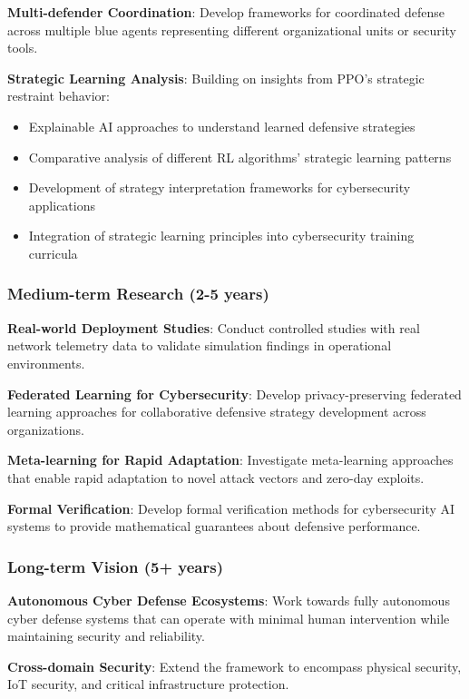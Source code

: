 \documentclass[12pt,twoside]{article}
\theoremstyle{definition}
\theoremstyle{plain}
\begin{document}
\textbf{Multi-defender Coordination}: Develop frameworks for coordinated defense across multiple blue agents representing different organizational units or security tools.

\textbf{Strategic Learning Analysis}: Building on insights from PPO's strategic restraint behavior:
\begin{itemize}
\item Explainable AI approaches to understand learned defensive strategies
\item Comparative analysis of different RL algorithms' strategic learning patterns
\item Development of strategy interpretation frameworks for cybersecurity applications
\item Integration of strategic learning principles into cybersecurity training curricula
\end{itemize}

\subsubsection{Medium-term Research (2-5 years)}

\textbf{Real-world Deployment Studies}: Conduct controlled studies with real network telemetry data to validate simulation findings in operational environments.

\textbf{Federated Learning for Cybersecurity}: Develop privacy-preserving federated learning approaches for collaborative defensive strategy development across organizations.

\textbf{Meta-learning for Rapid Adaptation}: Investigate meta-learning approaches that enable rapid adaptation to novel attack vectors and zero-day exploits.

\textbf{Formal Verification}: Develop formal verification methods for cybersecurity AI systems to provide mathematical guarantees about defensive performance.

\subsubsection{Long-term Vision (5+ years)}

\textbf{Autonomous Cyber Defense Ecosystems}: Work towards fully autonomous cyber defense systems that can operate with minimal human intervention while maintaining security and reliability.

\textbf{Cross-domain Security}: Extend the framework to encompass physical security, IoT security, and critical infrastructure protection.
\end{document}
